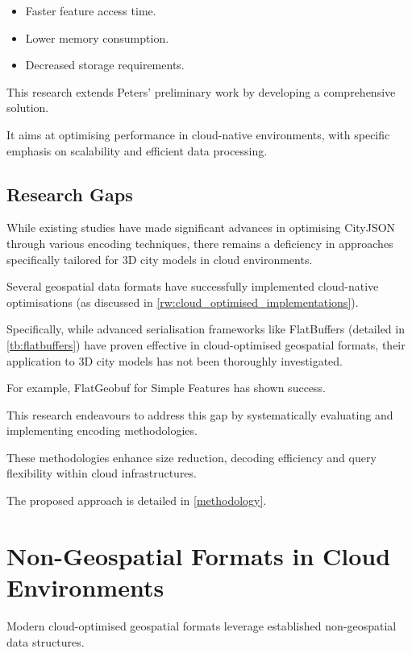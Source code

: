 \begin{itemize}
  \item Faster feature access time.
  \item Lower memory consumption.
  \item Decreased storage requirements.
\end{itemize}

This research extends Peters' preliminary work by developing a comprehensive solution.

It aims at optimising performance in cloud-native environments, with specific emphasis on scalability and efficient data processing.

\subsection{Research Gaps}
\label{rw:research_gaps}

While existing studies have made significant advances in optimising CityJSON through various encoding techniques, there remains a deficiency in approaches specifically tailored for 3D city models in cloud environments.

Several geospatial data formats have successfully implemented cloud-native optimisations (as discussed in \autoref{rw:cloud_optimised_implementations}).

Specifically, while advanced serialisation frameworks like FlatBuffers (detailed in \autoref{tb:flatbuffers}) have proven effective in cloud-optimised geospatial formats, their application to 3D city models has not been thoroughly investigated.

For example, FlatGeobuf for Simple Features \citep{flatgeobuf} has shown success.

This research endeavours to address this gap by systematically evaluating and implementing encoding methodologies.

These methodologies enhance size reduction, decoding efficiency and query flexibility within cloud infrastructures.

The proposed approach is detailed in \autoref{methodology}.

\section{Non-Geospatial Formats in Cloud Environments}
\label{rw:non_geospatial_formats}

Modern cloud-optimised geospatial formats leverage established non-geospatial data structures.

